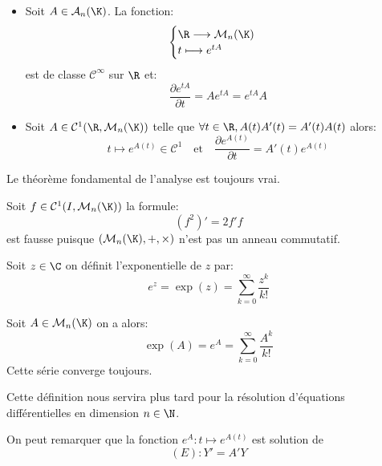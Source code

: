 \begin{prop} 
		\begin{itemize} 
			\item Soit $A \in \mathcal{A}_n(\K)$. La fonction:
			\[ 
				\begin{cases} 
					\R \longrightarrow \mathcal{M}_n(\K) \\ 
					t \longmapsto e^{tA} 
				\end{cases}
			\]
			est de classe $ \mathcal{C}^\infty$ sur $\R$ et: 
					\[ \boxed{ \frac{\partial e^{tA}}{\partial t} = A e^{tA} = e^{tA} A } \]
			\item Soit $A \in \mathcal{C}^1(\R, \mathcal{M}_n(\K))$ telle que 
			$ \forall t \in \R, A(t)A'(t) = A'(t) A(t)$  alors: 
				\[ t \longmapsto e^{A(t)} \in \mathcal{C}^1 \quad \text{et} \quad \frac{\partial e^{A(t)}}{\partial t} = A'(t)e^{A(t)} \]
		\end{itemize}
		Le théorème fondamental de l'analyse est toujours vrai. 
\end{prop}

\begin{remark} 
	Soit $f \in \mathcal{C}^1(I,\mathcal{M}_n(\K))$ la formule:
		\[ (f^2)' = 2f'f \] 
	est fausse puisque $( \mathcal{M}_n(\K), +, \times)$ n'est pas un anneau commutatif. 
\end{remark} 

\begin{definition}[Exponentielle] 
	Soit $z \in \C$ on définit l'exponentielle de $z$ par: 
		\[ e^z = \exp (z) = \sum_{k=0}^{\infty} \frac{z^k}{k!} \]
\end{definition} 

\begin{definition}
	Soit $A \in \mathcal{M}_n(\K)$ on a alors: 
		\[ \exp(A) = e^A = \sum_{k=0}^{\infty} \frac{A^k}{k!} \] 
	Cette série converge toujours. 
\end{definition} 

\begin{remark} 
	Cette définition nous servira plus tard pour la résolution d'équations 
	différentielles en dimension $n \in \N$. 

	On peut remarquer que la fonction $e^A : t \longmapsto e^{A(t)} $ est solution de 
		\[ (E) : Y' = A'Y \]
\end{remark} 


